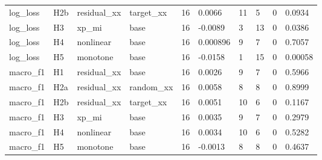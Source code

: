 \begin{tabular}{llllllllll}
log\_loss & H2b & residual\_xx & target\_xx & 16 & 0.0066 & 11 & 5 & 0 & 0.0934 \\
log\_loss & H3 & xp\_mi & base & 16 & -0.0089 & 3 & 13 & 0 & 0.0386 \\
log\_loss & H4 & nonlinear & base & 16 & 0.000896 & 9 & 7 & 0 & 0.7057 \\
log\_loss & H5 & monotone & base & 16 & -0.0158 & 1 & 15 & 0 & 0.00058 \\
macro\_f1 & H1 & residual\_xx & base & 16 & 0.0026 & 9 & 7 & 0 & 0.5966 \\
macro\_f1 & H2a & residual\_xx & random\_xx & 16 & 0.0058 & 8 & 8 & 0 & 0.8999 \\
macro\_f1 & H2b & residual\_xx & target\_xx & 16 & 0.0051 & 10 & 6 & 0 & 0.1167 \\
macro\_f1 & H3 & xp\_mi & base & 16 & 0.0035 & 9 & 7 & 0 & 0.2979 \\
macro\_f1 & H4 & nonlinear & base & 16 & 0.0034 & 10 & 6 & 0 & 0.5282 \\
macro\_f1 & H5 & monotone & base & 16 & -0.0013 & 8 & 8 & 0 & 0.4637 \\
\bottomrule
\end{tabular}
